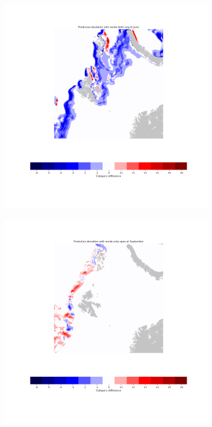 \documentclass[../main/thesis.tex]{subfiles}
\begin{document}
\begin{figure}
    \centering
    \begin{subfigure}{.49\textwidth}
        \includegraphics[width=\textwidth]{bias_winds-both-neg}
    \end{subfigure}
    \begin{subfigure}{.49\textwidth}
        \includegraphics[width=\textwidth]{bias_winds-only-xpos}

\end{subfigure}
\end{figure}
\end{document}
